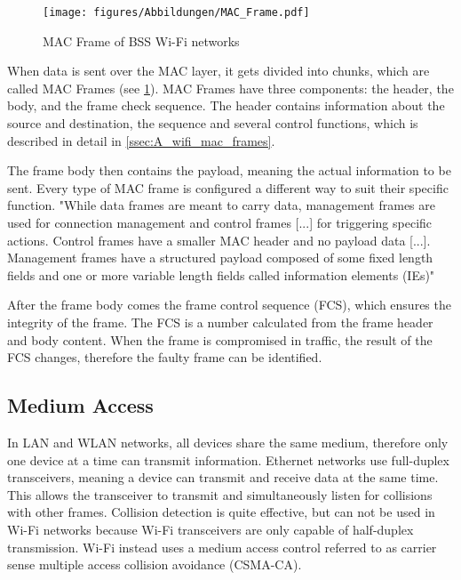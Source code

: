 \begin{figure}[h]
    \centering 
    \texttt{[image: figures/Abbildungen/MAC\_Frame.pdf]}
    \caption{MAC Frame of BSS Wi-Fi networks}
    \label{fig:mac_frame}
\end{figure}

When data is sent over the MAC layer, it gets divided into chunks, which are called MAC Frames (see \cref{fig:mac_frame}).
MAC Frames have three components: the header, the body, and the frame check sequence.
The header contains information about the source and destination, the sequence and several control functions, which is described in detail in \cref{ssec:A_wifi_mac_frames}.

The frame body then contains the payload, meaning the actual information to be sent.
Every type of MAC frame is configured a different way to suit their specific function.
"While data frames are meant to carry data, management frames are used for connection management and control frames [...] for triggering specific actions.
Control frames have a smaller MAC header and no payload data [...].
Management frames have a structured payload composed of some fixed length fields and one or more variable length fields called information elements (IEs)" \cite[page~12]{Sankaran_Gulasekaran_2021}

After the frame body comes the frame control sequence (FCS), which ensures the integrity of the frame.
The FCS is a number calculated from the frame header and body content.
When the frame is compromised in traffic, the result of the FCS changes, therefore the faulty frame can be identified. \cite{GeeksforGeeks_2023} \cite[page~10-12]{Sankaran_Gulasekaran_2021}

\subsection{Medium Access}
In LAN and WLAN networks, all devices share the same medium, therefore only one device at a time can transmit information.
Ethernet networks use full-duplex transceivers, meaning a device can transmit and receive data at the same time.
This allows the transceiver to transmit and simultaneously listen for collisions with other frames.
Collision detection is quite effective, but can not be used in Wi-Fi networks because Wi-Fi transceivers are only capable of half-duplex transmission.
Wi-Fi instead uses a medium access control referred to as carrier sense multiple access collision avoidance (CSMA-CA).

